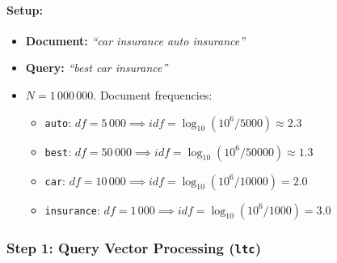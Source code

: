 \paragraph{Setup:}
\begin{itemize}
    \item \textbf{Document:} \textit{``car insurance auto insurance''}
    \item \textbf{Query:} \textit{``best car insurance''}
    \item $N = 1\,000\,000$. Document frequencies:
    \begin{itemize}
        \item \texttt{auto}: $df = 5\,000 \implies idf = \log_{10}(10^6 / 5000) \approx 2.3$
        \item \texttt{best}: $df = 50\,000 \implies idf = \log_{10}(10^6 / 50000) \approx 1.3$
        \item \texttt{car}: $df = 10\,000 \implies idf = \log_{10}(10^6 / 10000) = 2.0$
        \item \texttt{insurance}: $df = 1\,000 \implies idf = \log_{10}(10^6 / 1000) = 3.0$
    \end{itemize}
\end{itemize}

\subsubsection{Step 1: Query Vector Processing (\texttt{ltc})}

\begin{table}[H]
\centering
{}
\caption{Query vector computation under the \texttt{ltc} scheme.}
\label{tab:query-ltc-en}
\end{table}

